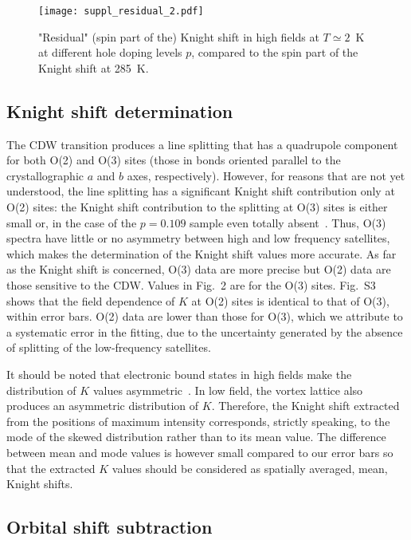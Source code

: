 \documentclass[superscriptaddress,twocolumn,prl,preprintnumbers,amsmath,amssymb]{revtex4}
\begin{document}
\begin{figure}%
\centerline{\texttt{[image: suppl\_residual\_2.pdf]}} %
 \caption{"Residual" (spin part of the) Knight shift in high fields at $T\simeq 2$~K at different hole doping levels $p$, compared to the spin part of the Knight shift at 285~K.}
 \label{suppl_residual}
\end{figure}


\subsection*{\bf Knight shift determination}

The CDW transition produces a line splitting that has a quadrupole component for both O(2) and O(3) sites (those in bonds oriented parallel to the crystallographic $a$ and $b$ axes, respectively). However, for reasons that are not yet understood, the line splitting has a significant Knight shift contribution only at O(2) sites: the Knight shift contribution to the splitting at O(3) sites is either small or, in the case of the $p=0.109$ sample even totally absent~\cite{Wu15}. Thus, O(3) spectra have little or no asymmetry between high and low frequency satellites, which makes the determination of the Knight shift values more accurate. As far as the Knight shift is concerned, O(3) data are more precise but O(2) data are those sensitive to the CDW. Values in Fig.~2 are for the O(3) sites. Fig.~S3 shows that the field dependence of $K$ at O(2) sites is identical to that of O(3), within error bars. O(2) data are lower than those for O(3), which we attribute to a systematic error in the fitting, due to the uncertainty generated by the absence of splitting of the low-frequency satellites.


It should be noted that electronic bound states in high fields make the distribution of $K$ values asymmetric~\cite{Zhou17}. In low field, the vortex lattice also produces an asymmetric distribution of $K$. Therefore, the Knight shift extracted from the positions of maximum intensity corresponds, strictly speaking, to the mode of the skewed distribution rather than to its mean value. The difference between mean and mode values is however small compared to our error bars so that the extracted $K$ values should be considered as spatially averaged, mean, Knight shifts.


\subsection*{\bf Orbital shift subtraction}
\end{document}
